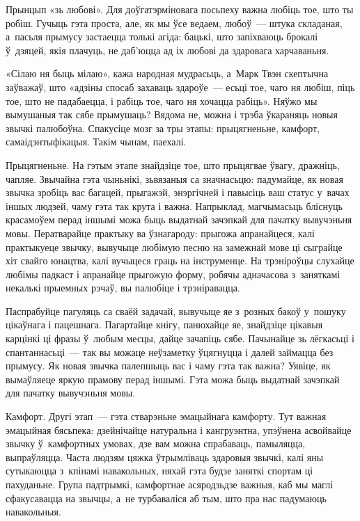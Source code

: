 Прынцып «зь любові». Для доўгатэрміновага посьпеху важна любіць тое, што ты робіш. Гучыць гэта проста, але, як мы ўсе ведаем, любоў~--- штука складаная, а~пасьля прымусу застаецца толькі агіда: бацькі, што запіхваюць брокалі ў~дзяцей, якія плачуць, не даб'юцца ад іх любові да здаровага харчаваньня.

«Сілаю ня быць мілаю», кажа народная мудрасьць, а~Марк Твэн скептычна заўважаў, што «адзіны спосаб захаваць здароўе~--- есьці тое, чаго ня любіш, піць тое, што не падабаецца, і рабіць тое, чаго ня хочацца рабіць». Няўжо мы вымушаныя так сябе прымушаць? Вядома не, можна і трэба ўкараняць новыя звычкі палюбоўна. Спакусіце мозг за тры этапы: прыцягненьне, камфорт, самаідэнтыфікацыя. Такім чынам, паехалі.

Прыцягненьне. На гэтым этапе знайдзіце тое, што прыцягвае ўвагу, дражніць, чапляе. Звычайна гэта чыньнікі, зьвязаныя са значнасьцю: падумайце, як новая звычка зробіць вас багацей, прыгажэй, энэргічней і павысіць ваш статус у~вачах іншых людзей, чаму гэта так крута і важна. Напрыклад, магчымасьць бліснуць красамоўем перад іншымі можа быць выдатнай зачэпкай для пачатку вывучэньня мовы. Ператварайце практыку ва ўзнагароду: прыгожа апранайцеся, калі практыкуеце звычку, вывучыце любімую песню на замежнай мове ці сыграйце хіт свайго юнацтва, калі вучыцеся граць на інструменце. На трэніроўцы слухайце любімы падкаст і апранайце прыгожую форму, робячы адначасова з~заняткамі некалькі прыемных рэчаў, вы палюбіце і трэніравацца.

Паспрабуйце пагуляць са сваёй задачай, вывучыце яе з~розных бакоў у~пошуку цікаўнага і пацешнага. Пагартайце кнігу, панюхайце яе, знайдзіце цікавыя карцінкі ці фразы ў~любым месцы, дайце зачапіць сябе. Пачынайце зь лёгкасьці і спантаннасьці~--- так вы можаце неўзаметку ўцягнуцца і далей займацца без прымусу. Як новая звычка палепшыць вас і чаму гэта так важна? Уявіце, як вымаўляеце яркую прамову перад іншымі. Гэта можа быць выдатнай зачэпкай для пачатку вывучэньня мовы.

Камфорт. Другі этап~--- гэта стварэньне эмацыйнага камфорту. Тут важная эмацыйная бясьпека: дзейнічайце натуральна і кангруэнтна, упэўнена асвойвайце звычку ў~камфортных умовах, дзе вам можна спрабаваць, памыляцца, выпраўляцца. Часта людзям цяжка ўтрымліваць здаровыя звычкі, калі яны сутыкаюцца з~кпінамі навакольных, няхай гэта будзе заняткі спортам ці пахуданьне. Група падтрымкі, камфортнае асяродзьдзе важныя, каб мы маглі сфакусавацца на звычцы, а~не турбаваліся аб тым, што пра нас падумаюць навакольныя.

